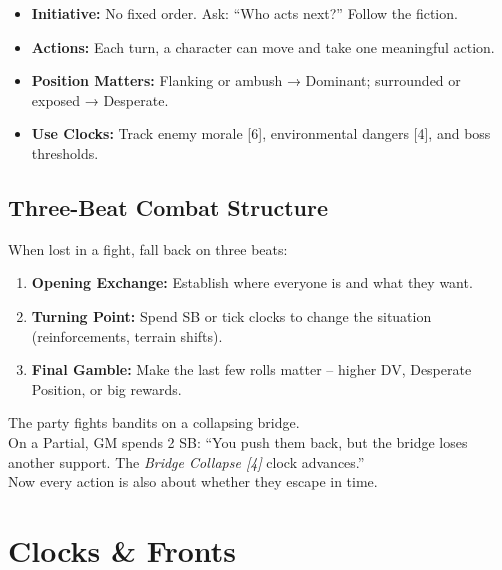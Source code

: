 \begin{tcolorbox}[title=Combat Quick Reference, colback=white!97!gray, colframe=black!80!gray]
\begin{itemize}
\item \textbf{Initiative:} No fixed order. Ask: “Who acts next?” Follow the fiction.
\item \textbf{Actions:} Each turn, a character can move and take one meaningful action.
\item \textbf{Position Matters:} Flanking or ambush → Dominant; surrounded or exposed → Desperate.
\item \textbf{Use Clocks:} Track enemy morale [6], environmental dangers [4], and boss thresholds.
\end{itemize}
\end{tcolorbox}

\subsection{Three-Beat Combat Structure}
\label{subsec:three-beat-combat}
When lost in a fight, fall back on three beats:
\begin{enumerate}
\item \textbf{Opening Exchange:} Establish where everyone is and what they want.
\item \textbf{Turning Point:} Spend SB or tick clocks to change the situation (reinforcements, terrain shifts).
\item \textbf{Final Gamble:} Make the last few rolls matter – higher DV, Desperate Position, or big rewards.
\end{enumerate}

\begin{tcolorbox}[colback=gray!5,colframe=gray!75!black,title=\textbf{Example: SB in Combat}]
The party fights bandits on a collapsing bridge.\\
On a Partial, GM spends 2 SB: “You push them back, but the bridge loses another support. The \emph{Bridge Collapse [4]} clock advances.”\\
Now every action is also about whether they escape in time.
\end{tcolorbox}

\section{Clocks \& Fronts}
\label{sec:clocks-fronts}

